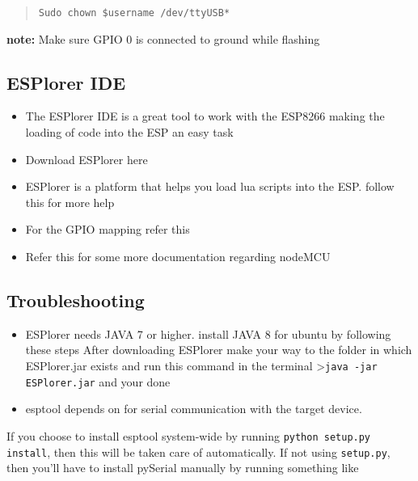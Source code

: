 \documentclass[16pt]{article}
\begin{document}
\begin{quote}
\texttt{Sudo chown \$username /dev/ttyUSB*}
\end{quote}

\textbf{note:} Make sure GPIO 0 is connected to ground while flashing
\vspace{0.5cm}

\subsection{ESPlorer IDE}

\begin{itemize}

\item
  The ESPlorer IDE is a great tool to work with the ESP8266 making the
  loading of code into the ESP an easy task
\item
  Download ESPlorer here
\item
  ESPlorer is a platform that helps you load lua scripts into the ESP.
  follow this for more help
\item
  For the GPIO mapping refer this
\item
  Refer this for some more documentation regarding nodeMCU
\end{itemize}

\subsection{Troubleshooting}

\begin{itemize}

\item
  ESPlorer needs JAVA 7 or higher. install JAVA 8 for ubuntu by
  following these steps
  After downloading ESPlorer make your way to the folder in which
  ESPlorer.jar exists and run this command in the terminal
  \textgreater{}\texttt{java -jar ESPlorer.jar} and your done
\item
  esptool depends on %
  for serial communication with the target device.
\end{itemize}

If you choose to install esptool system-wide by running
\texttt{python setup.py install}, then this will be taken care of
automatically.
If not using \texttt{setup.py}, then you'll have to install pySerial
manually by running something like \\
\end{document}
